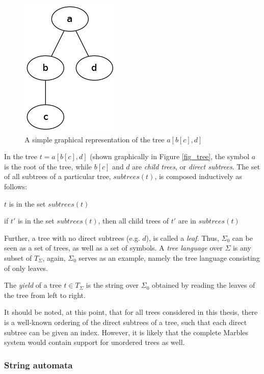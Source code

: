 \begin{figure}[htb]
\label{fig_tree}
\center
\includegraphics[scale=0.5]{tree.png}
\caption{A simple graphical representation of the tree $a[b[c],d]$}
\end{figure}

In the tree $t = a[b[c],d]$ (shown graphically in Figure \vref{fig_tree}, the
symbol $a$ is the root of the tree, while $b[c]$ and $d$ are
\emph{child trees}, or \emph{direct subtrees}. The set of all subtrees of a
particular tree, $subtrees(t)$, is composed inductively as follows:
\begin{compactitem}
\item $t$ is in the set $subtrees(t)$
\item if $t'$ is in the set $subtrees(t)$, then all child trees of $t'$ are
in $subtrees(t)$
\end{compactitem}

Further, a tree with no direct subtrees (e.g. $d$), is called a
\emph{leaf}. Thus, $\Sigma_0$ can be seen as a set of trees, as well as a
set of symbols. A \emph{tree language} over $\Sigma$ is any subset of
$T_\Sigma$, again, $\Sigma_0$ serves as an example, namely the tree
language consisting of only leaves.

The \textit{yield} of a tree $t \in T_\Sigma$ is the string over $\Sigma_0$
obtained by reading the leaves of the tree from left to right. 

It should be noted, at this point, that for all trees considered in this
thesis, there is a well-known ordering of the direct subtrees of a tree,
such that each direct subtree can be given an index. However, it is likely
that the complete Marbles system would contain support for unordered trees
as well. 

\subsubsection{String automata}
\label{ssec_fsa}


